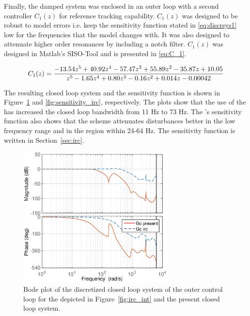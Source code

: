 \FloatBarrier
Finally, the damped system was enclosed in an outer loop with a second controller $C_1(z)$ for reference tracking capability. $C_1(z)$ was designed to be robust to model errors i.e. keep the sensitivity function stated in \eqref{eq:discrsys1} low for the frequencies that the model changes with. It was also designed to attenuate higher order resonances by including a notch filter. $C_1(z)$ was designed in Matlab's SISO-Tool and is presented in \eqref{eq:C_1}.

\begin{equation}
  \label{eq:C_1}
  C_1(z) = \frac{-13.54 z^5 + 40.92 z^4 - 57.47 z^3 + 55.89 z^2 - 35.87 z + 10.05}{z^5 - 1.65 z^4 + 0.80 z^3 - 0.16 z^2 + 0.014 z - 0.00042} \\
\end{equation}

The resulting closed loop system and the sensitivity function is shown in Figure~\ref{fig:irc_totalclosed} and \ref{fig:sensitivity_irc}, respectively. The plots show that the use of the \abbrIRC has increased the closed loop bandwidth from 11 Hz to 73 Hz. The \abbrIRC's sensitivity function also shows that the \abbrIRC scheme attenuates disturbances better in the low frequency range and in the region within 24-64 Hz. The sensitivity function is written in Section~\ref{sec:irc}.

\begin{figure}[h!]
  \centering
  \includegraphics[width=0.7\textwidth]{fig/matlab/totalclosedloop.eps}
  \caption{\label{fig:irc_totalclosed} Bode plot of the discretized closed loop system of the outer control loop for the \abbrIRC depicted in Figure~\ref{fig:irc_int} and the present closed loop system.}
\end{figure}

